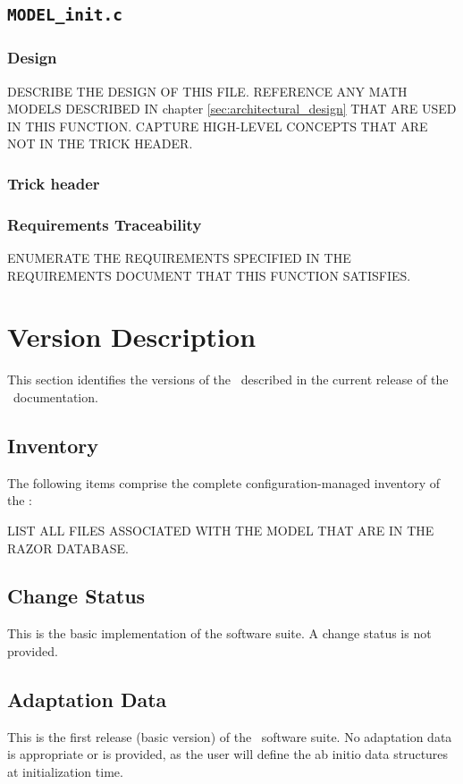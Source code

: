 \documentclass[twoside,11pt,titlepage]{report}
\begin{document}
\section{\texorpdfstring{\tt MODEL\_init.c}{MODEL\_init.c}}

\subsection{Design}

DESCRIBE THE DESIGN OF THIS FILE. REFERENCE ANY MATH MODELS
DESCRIBED IN chapter \ref{sec:architectural_design} THAT
ARE USED IN THIS FUNCTION.
CAPTURE HIGH-LEVEL CONCEPTS THAT ARE NOT IN THE TRICK HEADER.

\subsection{Trick header}

% 

\subsection{Requirements Traceability}

ENUMERATE THE REQUIREMENTS SPECIFIED IN THE REQUIREMENTS
DOCUMENT THAT THIS FUNCTION SATISFIES.


\chapter{Version Description}\label{sec:versions}
This section identifies the versions of the
\MODEL\ described in the current release of the \MODEL\ documentation.

\section{Inventory}
The following items comprise the complete configuration-managed
inventory of the \MODEL:

LIST ALL FILES ASSOCIATED WITH THE MODEL THAT ARE IN THE RAZOR DATABASE.

\section{Change Status}
This is the basic implementation of the software suite. A change
status is not provided.

\section{Adaptation Data}
This is the first release (basic version) of the \MODEL\ software suite.
No adaptation data is appropriate or is provided, as the user will
define the ab initio data structures at initialization time.
\end{document}

